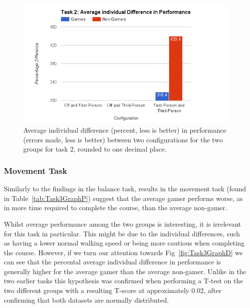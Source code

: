 \documentclass[runningheads,a4paper,oribibl]{llncs}
\begin{document}

\begin{figure}
   \centering
   \includegraphics[width=\textwidth]{ExternalMaterial/Task2GraphD}
   \caption{Average individual difference (percent, less is better) in performance (errors made, less is better) between two configurations for the two groups for task 2, rounded to one decimal place.} \label{fig:Task2GraphD}
\end{figure}













\subsubsection{Movement Task}
Similarly to the findings in the balance task, results in the movement task (found in Table~\ref{tab:Task3GraphP}) suggest that the average gamer performs worse, as in more time required to complete the course, than the average non-gamer. 

Whilst average performance among the two groups is interesting, it is irrelevant for this task in particular. This might be due to the individual differences, such as having a lower normal walking speed or being more cautious when completing the course. However, if we turn our attention towards Fig~\ref{fig:Task3GraphD} we can see that the percental average individual difference in performance is generally higher for the average gamer than the average non-gamer. Unlike in the two earlier tasks this hypothesis was confirmed when performing a T-test on the two different groups with a resulting T-score at approximately 0.02, after confirming that both datasets are normally distributed.
\end{document}
